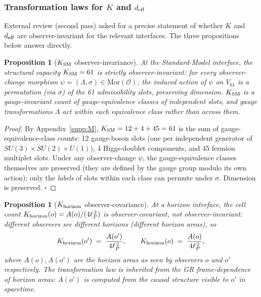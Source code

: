 \documentclass[11pt]{article}
\theoremstyle{plain}
\newtheorem{proposition}[theorem]{Proposition}
\theoremstyle{definition}
\theoremstyle{remark}
\begin{document}
\subsubsection*{Transformation laws for $K$ and $d_{\rm eff}$}

\noindent External review (second pass) asked for a precise statement of whether $K$ and $d_{\rm eff}$ are observer-invariant for the relevant interfaces.  The three propositions below answer directly.

\begin{proposition}[$K_{\rm SM}$ observer-invariance]\label{prop:K_SM_invariance}
At the Standard-Model interface, the structural capacity $K_{\rm SM} = 61$ is strictly observer-invariant: for every observer-change morphism $\psi = (\Lambda, \sigma) \in \mathrm{Mor}(\mathcal{O})$, the induced action of $\psi$ on $V_{61}$ is a permutation (via $\sigma$) of the 61 admissibility slots, preserving dimension.  $K_{\rm SM}$ is a gauge-invariant count of gauge-equivalence classes of independent slots, and gauge transformations $\Lambda$ act within each equivalence class rather than across them.
\end{proposition}

\begin{proof}
By Appendix~\ref{supp:M}, $K_{\rm SM} = 12 + 4 + 45 = 61$ is the sum of gauge-equivalence-class counts: 12 gauge-boson slots (one per independent generator of $SU(3) \times SU(2) \times U(1)$), 4 Higgs-doublet components, and 45 fermion multiplet slots.  Under any observer-change $\psi$, the gauge-equivalence classes themselves are preserved (they are defined by the gauge group modulo its own action); only the \emph{labels} of slots within each class can permute under $\sigma$.  Dimension is preserved.  $\square$
\end{proof}

\begin{proposition}[$K_{\rm horizon}$ observer-covariance]\label{prop:K_horizon_covariance}
At a horizon interface, the cell count $K_{\rm horizon}(o) = A(o)/(4\ell_P^{\,2})$ is observer-\emph{covariant}, not observer-invariant: different observers see different horizons (different horizon areas), so
\[
  K_{\rm horizon}(o') \;=\; \frac{A(o')}{4\ell_P^{\,2}},
  \qquad
  K_{\rm horizon}(o) \;=\; \frac{A(o)}{4\ell_P^{\,2}},
\]
where $A(o), A(o')$ are the horizon areas as seen by observers $o$ and $o'$ respectively.  The transformation law is inherited from the GR frame-dependence of horizon areas: $A(o')$ is computed from the causal structure visible to $o'$ in spacetime.
\end{proposition}
\end{document}
